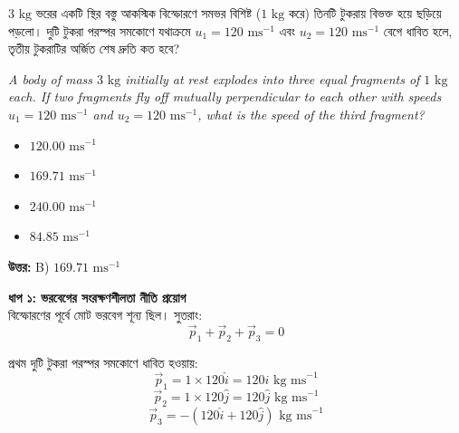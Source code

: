 \documentclass[12pt, a4paper]{article}
\begin{document}
{{\newpage
\begin{tcolorbox}[questionbox={প্রশ্ন (Question) 25}]
\noindent
$3\text{ kg}$ ভরের একটি স্থির বস্তু আকস্মিক বিস্ফোরণে সমভর বিশিষ্ট ($1\text{ kg}$ করে) তিনটি টুকরায় বিভক্ত হয়ে ছড়িয়ে পড়লো। দুটি টুকরা পরস্পর সমকোণে যথাক্রমে $u_1 = 120\text{ ms}^{-1}$ এবং $u_2 = 120\text{ ms}^{-1}$ বেগে ধাবিত হলে, তৃতীয় টুকরাটির অর্জিত শেষ দ্রুতি কত হবে?
\vspace{0.8em}
\begin{english}
\noindent\textit{\color{darkgray}
A body of mass $3\text{ kg}$ initially at rest explodes into three equal fragments of $1\text{ kg}$ each. If two fragments fly off mutually perpendicular to each other with speeds $u_1 = 120\text{ ms}^{-1}$ and $u_2 = 120\text{ ms}^{-1}$, what is the speed of the third fragment?
}
\end{english}
\end{tcolorbox}

\begin{itemize}[label={}, leftmargin=1cm, itemsep=0.5em]
\item[\textbf{A)}] $120.00\text{ ms}^{-1}$
\item[\textbf{B)}] $169.71\text{ ms}^{-1}$
\item[\textbf{C)}] $240.00\text{ ms}^{-1}$
\item[\textbf{D)}] $84.85\text{ ms}^{-1}$
\end{itemize}
\vspace{0.5em}

\begin{tcolorbox}[answerbox]
\textbf{\color{success} উত্তর:} B) $169.71\text{ ms}^{-1}$
\end{tcolorbox}
\vspace{1em}

\begin{tcolorbox}[solutionbox={সমাধান (Solution)}]
\noindent
\textbf{ধাপ ১: ভরবেগের সংরক্ষণশীলতা নীতি প্রয়োগ} \\
বিস্ফোরণের পূর্বে মোট ভরবেগ শূন্য ছিল। সুতরাং:
\[\vec{p}_1 + \vec{p}_2 + \vec{p}_3 = 0\]

প্রথম দুটি টুকরা পরস্পর সমকোণে ধাবিত হওয়ায়:
\[\vec{p}_1 = 1 \times 120\hat{i} = 120\hat{i}\text{ kg ms}^{-1}\]
\[\vec{p}_2 = 1 \times 120\hat{j} = 120\hat{j}\text{ kg ms}^{-1}\]
\[\vec{p}_3 = -(120\hat{i} + 120\hat{j})\text{ kg ms}^{-1}\]


\end{tcolorbox}}}
\end{document}
